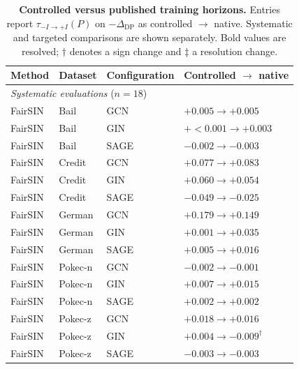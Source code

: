 \begin{table}[t]
\centering
\caption{
\textbf{Controlled versus published training horizons.}
Entries report
\(\tau_{-I\rightarrow +I}(P)\) on
\(-\Delta_{\mathrm{DP}}\) as
controlled \(\rightarrow\) native.
Systematic and targeted comparisons are shown separately.
Bold values are resolved;
\(\dagger\) denotes a sign change and
\(\ddagger\) a resolution change.
}
\label{tab:native-horizon-pairs}
\vspace{-0.2cm}
\scriptsize
\setlength{\tabcolsep}{4pt}
\renewcommand{\arraystretch}{1.03}

\begin{tabular}{llll}
\toprule
Method & Dataset & Configuration & Controlled \(\rightarrow\) native \\
\midrule

\multicolumn{4}{l}{\textit{Systematic evaluations} (\(n=18\))} \\
\addlinespace[1pt]

FairSIN & Bail & GCN
& \(+0.005 \rightarrow +0.005\) \\
FairSIN & Bail & GIN
& \(+{<}0.001 \rightarrow +0.003\) \\
FairSIN & Bail & SAGE
& \(-0.002 \rightarrow -0.003\) \\

FairSIN & Credit & GCN
& \(\mathbf{+0.077} \rightarrow \mathbf{+0.083}\) \\
FairSIN & Credit & GIN
& \(\mathbf{+0.060} \rightarrow \mathbf{+0.054}\) \\
FairSIN & Credit & SAGE
& \(-0.049 \rightarrow -0.025\) \\

FairSIN & German & GCN
& \(\mathbf{+0.179} \rightarrow \mathbf{+0.149}\) \\
FairSIN & German & GIN
& \(+0.001 \rightarrow +0.035\) \\
FairSIN & German & SAGE
& \(+0.005 \rightarrow +0.016\) \\

FairSIN & Pokec-n & GCN
& \(-0.002 \rightarrow -0.001\) \\
FairSIN & Pokec-n & GIN
& \(+0.007 \rightarrow +0.015\) \\
FairSIN & Pokec-n & SAGE
& \(+0.002 \rightarrow +0.002\) \\

FairSIN & Pokec-z & GCN
& \(\mathbf{+0.018} \rightarrow \mathbf{+0.016}\) \\
FairSIN & Pokec-z & GIN
& \(+0.004 \rightarrow -0.009^{\dagger}\) \\
FairSIN & Pokec-z & SAGE
& \(-0.003 \rightarrow -0.003\) \\


\end{tabular}
\end{table}
